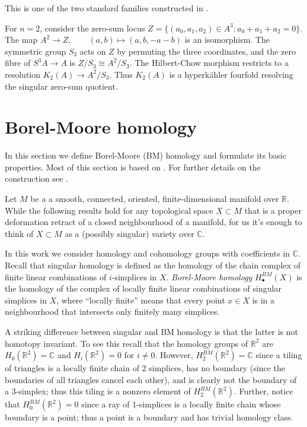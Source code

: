 \begin{reference}
This is one of the two standard families
constructed in \cite{beauville-kummer}.
\end{reference}

\begin{example}
\label{example-kummer-fourfold}
For $n=2$, consider the zero-sum locus
$
Z=
\{(a_0,a_1,a_2)\in A^3:
a_0+a_1+a_2=0\}.
$
The map
$
A^2\longrightarrow Z,
\qquad
(a,b)\longmapsto(a,b,-a-b)
$
is an isomorphism. The symmetric group
$S_3$ acts on $Z$ by permuting the three
coordinates, and the zero fibre of
$
S^3A\longrightarrow A
$
is
$
Z/S_3\cong A^2/S_3.
$
The Hilbert-Chow morphism restricts to a
resolution
$
K_2(A)\longrightarrow A^2/S_3.
$
Thus $K_2(A)$ is a hyperk\"ahler fourfold
resolving the singular zero-sum quotient.
\end{example}

\section{Borel-Moore homology}
\label{section-bm}

\noindent
In this section we define Borel-Moore (BM)
homology
and formulate its basic properties.
Most of this section is based on \cite[Video
9]{videos}.
For further details on the construction see
\cite{Fulton-Young-Tableaux}.

\medskip\noindent
Let $M$ be a a smooth, connected,
oriented, finite-dimensional manifold over
$\mathbb{R}$.
While the following results hold for any
topological space $X \subset M$
that is a proper deformation retract
of a closed neighbourhood of a manifold,
for us it's enough to think of $X \subset M$
as a
(possibly singular) variety over
$\mathbb{C}$.

In this work we consider homology and
cohomology
groups with coefficients in $\mathbb{C}$.
Recall that singular homology is defined
as the homology of the chain complex of
finite linear combinations of $i$-simplices
in $X$.
\textit{Borel-Moore homology}
$H_\bullet^{BM}(X)$
is the homology of the complex of locally
finite
linear combinations of singular simplices in
$X$,
where ``locally finite'' means that every
point $x \in X$ is in a neighbourhood
that intersects only finitely many
simplices.

A striking
difference between singular and BM homology
is that the latter is not homotopy invariant.
To see this recall that the homology groups
of  $\mathbb{R}^2$ are
$H_0(\mathbb{R}^2)=\mathbb{C}$
and $H_i(\mathbb{R}^2)=0$ for $i \neq 0$.
However, $H_2^{BM}(\mathbb{R}^2)=\mathbb{C}$
since a tiling of triangles
is a locally finite chain of 2 simplices,
has no boundary (since the boundaries of
all triangles cancel each other),
and is clearly not the boundary of a
3-simplex;
thus this tiling is a nonzero element of
$H_2^{BM}(\mathbb{R}^2)$.
Further, notice that
$H_0^{BM}(\mathbb{R}^2)=0$
since a ray of 1-simplices
is a locally finite chain
whose boundary is a point;
thus a point is a boundary and
has trivial homology class.

